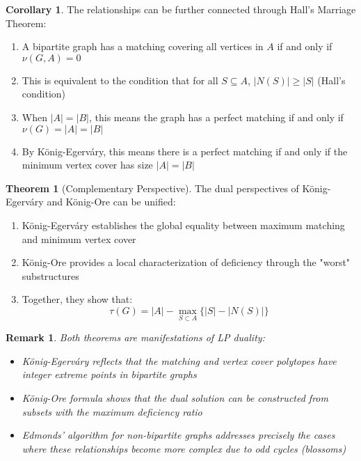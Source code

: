 \documentclass{article}
\newtheorem{remark}{Remark}
\theoremstyle{definition}
\newtheorem{theorem}{Theorem}
\newtheorem{corollary}{Corollary}
\begin{document}
\begin{corollary}
The relationships can be further connected through Hall's Marriage Theorem:
\begin{enumerate}
    \item A bipartite graph has a matching covering all vertices in $A$ if and only if $\nu(G, A) = 0$
    \item This is equivalent to the condition that for all $S \subseteq A$, $|N(S)| \geq |S|$ (Hall's condition)
    \item When $|A| = |B|$, this means the graph has a perfect matching if and only if $\nu(G) = |A| = |B|$
    \item By König-Egerváry, this means there is a perfect matching if and only if the minimum vertex cover has size $|A| = |B|$
\end{enumerate}
\end{corollary}

\begin{theorem}[Complementary Perspective]
The dual perspectives of König-Egerváry and König-Ore can be unified:
\begin{enumerate}
    \item König-Egerváry establishes the global equality between maximum matching and minimum vertex cover
    \item König-Ore provides a local characterization of deficiency through the "worst" substructures
    \item Together, they show that:
    \[
    \tau(G) = |A| - \max_{S \subset A} \{|S| - |N(S)|\}
    \]
\end{enumerate}
\end{theorem}

\begin{remark}
Both theorems are manifestations of LP duality:
\begin{itemize}
    \item König-Egerváry reflects that the matching and vertex cover polytopes have integer extreme points in bipartite graphs
    \item König-Ore formula shows that the dual solution can be constructed from subsets with the maximum deficiency ratio
    \item Edmonds' algorithm for non-bipartite graphs addresses precisely the cases where these relationships become more complex due to odd cycles (blossoms)
\end{itemize}
\end{remark}

\pagebreak
\newpage
\clearpage
\end{document}
